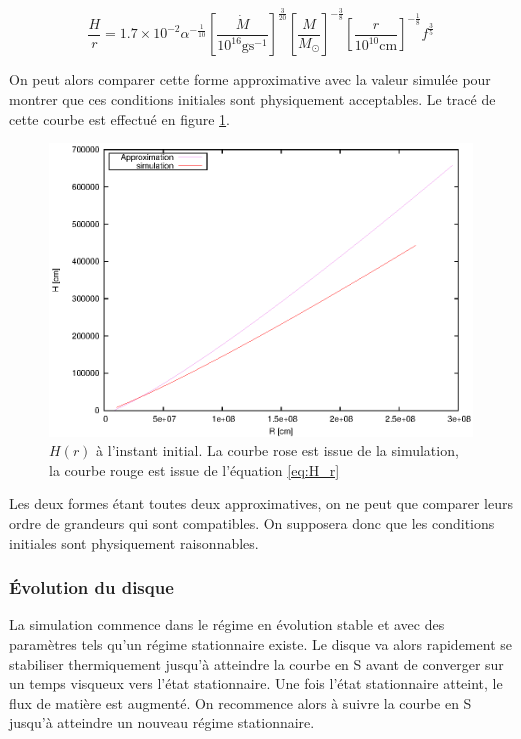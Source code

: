 \begin{equation}
  \label{eq:H_r}
	\frac{H}{r} = 1.7 \times 10^{-2}\alpha^{- \frac{1}{10}} \left[ \frac{\dot{M}}{10^{16} \mbox{g} \mbox{s}^{-1}} \right]^{\frac{3}{20}} \left[ \frac{M}{M_\odot}\right]^{- \frac{3}{8}} \left[ \frac{r}{10^{10} \mathrm{cm}}\right]^{- \frac{1}{8}} f^{\frac{3}{5}}
\end{equation}
 
On peut alors comparer cette forme approximative avec la valeur simulée pour montrer que ces 
conditions initiales sont physiquement acceptables. Le tracé de cette courbe est effectué en figure \ref{fig:H_r}.

\begin{figure}
  \begin{center}
    \includegraphics[]{ic_h.eps}
  \end{center}
  \caption{$H(r)$ à l'instant initial. La courbe rose est issue de la simulation, la courbe rouge est issue de l'équation \eqref{eq:H_r}}
  \label{fig:H_r}
\end{figure} 

Les deux formes étant toutes deux approximatives, on ne peut que comparer leurs
ordre de grandeurs qui sont compatibles. On supposera donc que les conditions
initiales sont physiquement raisonnables.

\subsubsection{Évolution du disque}

La simulation commence dans le régime en évolution stable et avec des
paramètres tels qu'un régime stationnaire existe. Le disque va alors rapidement
se stabiliser thermiquement jusqu'à atteindre la courbe en S avant de converger
sur un temps visqueux vers l'état stationnaire. Une fois l'état stationnaire
atteint, le flux de matière est augmenté. On recommence alors à suivre la
courbe en S jusqu'à atteindre un nouveau régime stationnaire.

